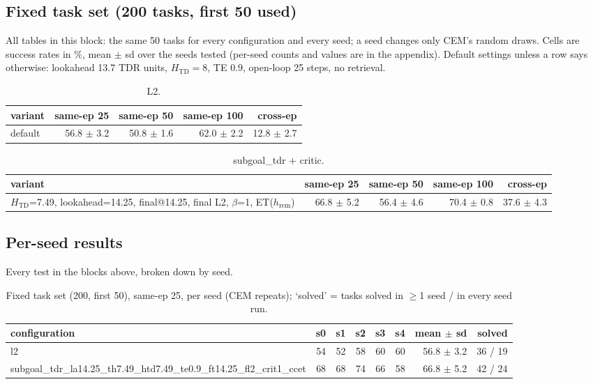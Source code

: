 \subsection*{Fixed task set (200 tasks, first 50 used)}
All tables in this block: the same 50 tasks for every configuration and every seed; a seed changes only CEM's random draws. Cells are success rates in \%, mean $\pm$ sd over the seeds tested (per-seed counts and values are in the appendix). Default settings unless a row says otherwise: lookahead 13.7 TDR units, $H_{\mathrm{TD}}=8$, TE 0.9, open-loop 25 steps, no retrieval.

\begin{table}[H]
\centering\small
\caption{L2.}
\label{tab:gas-mpc-l2-task200-n50}
\begin{tabular}{lrrrr}
\toprule
variant & same-ep 25 & same-ep 50 & same-ep 100 & cross-ep \\
\midrule
default & 56.8 $\pm$ 3.2 & 50.8 $\pm$ 1.6 & 62.0 $\pm$ 2.2 & 12.8 $\pm$ 2.7 \\
\bottomrule
\end{tabular}
\end{table}

\begin{table}[H]
\centering\small
\caption{subgoal\_tdr + critic.}
\label{tab:gas-mpc-subgoal_tdr-crit-task200-n50}
\begin{tabular}{lrrrr}
\toprule
variant & same-ep 25 & same-ep 50 & same-ep 100 & cross-ep \\
\midrule
$H_{\mathrm{TD}}$=7.49, lookahead=14.25, final@14.25, final L2, $\beta$=1, ET($h_{\mathrm{rem}}$) & 66.8 $\pm$ 5.2 & 56.4 $\pm$ 4.6 & 70.4 $\pm$ 0.8 & 37.6 $\pm$ 4.3 \\
\bottomrule
\end{tabular}
\end{table}

\clearpage
\subsection*{Per-seed results}
Every test in the blocks above, broken down by seed.

\begin{table}[H]
\centering\small
\caption{Fixed task set (200, first 50), same-ep 25, per seed (CEM repeats); `solved' = tasks solved in $\ge$1 seed / in every seed run.}
\label{tab:gas-mpc-pooled-same25-task200-n50}
\begin{tabular}{lrrrrrrr}
\toprule
configuration & s0 & s1 & s2 & s3 & s4 & mean $\pm$ sd & solved \\
\midrule
l2 & 54 & 52 & 58 & 60 & 60 & 56.8 $\pm$ 3.2 & 36 / 19 \\
subgoal\_tdr\_la14.25\_th7.49\_htd7.49\_te0.9\_ft14.25\_fl2\_crit1\_ccet & 68 & 68 & 74 & 66 & 58 & 66.8 $\pm$ 5.2 & 42 / 24 \\
\bottomrule
\end{tabular}
\end{table}

